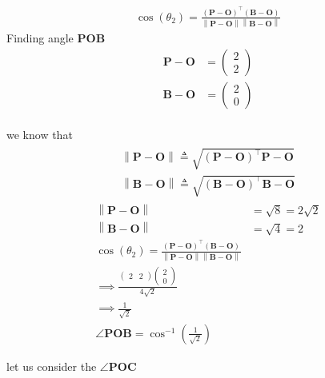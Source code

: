 \documentclass[12pt,-letter paper]{article}
\let\vec\mathbf{}
\let\vec\mathbf{}
\let\vec\mathbf{}
\providecommand{\brak}[1]{\ensuremath{\left(#1\right)}}
\providecommand{\norm}[1]{\left\lVert#1\right\rVert}
\newcommand{\myvec}[1]{\ensuremath{\begin{pmatrix}#1\end{pmatrix}}}
\begin{document}
\begin{enumerate}
    \begin{align}
	\cos{\brak{\theta_2}} = \frac{(\vec{P}-\vec{O})^\top(\vec{B}-\vec{O})}{\norm{\vec{P}-\vec{O}}\norm{\vec{B}-\vec{O}}}
\end{align}
Finding angle $\vec{POB}$  \\
\begin{align}
	\vec{P}-\vec{O} &=\myvec{2\\2}
\end{align}
\begin{align}
	\vec{B}-\vec{O} &=\myvec{2\\0}
\end{align}
\\we know that 
 \begin{align}
 \begin{split}
     \norm{\vec{P}-\vec{O}} \triangleq \sqrt{\brak{\vec{P}-\vec{O}}^{\top}{\vec{P}-\vec{O}}}\\
     \norm{\vec{B}-\vec{O}} \triangleq \sqrt{\brak{\vec{B}-\vec{O}}^{\top}{\vec{B}-\vec{O}}}
 \end{split}
		\end{align}
\begin{align}
	\norm{\vec{P}-\vec{O}} &= \sqrt{8} = 2\sqrt{2} \\
	\norm{\vec{B}-\vec{O}} &= \sqrt{4} = 2\\
 \cos{\brak{\theta_2}} = \frac{(\vec{P}-\vec{O})^\top(\vec{B}-\vec{O})}{\norm{\vec{P}-\vec{O}}\norm{\vec{B}-\vec{O}}}\\
 \implies \frac{\myvec{2&2}\myvec{2\\0} }{4\sqrt{2}}\\
 \implies \frac{1}{\sqrt{2}}\\
\angle \vec{POB} = \cos^{-1}\brak{{\frac{1}{\sqrt{2}}}}
\end{align}


let us consider the $\angle \vec{POC}$ 
  

\end{enumerate}
\end{document}
